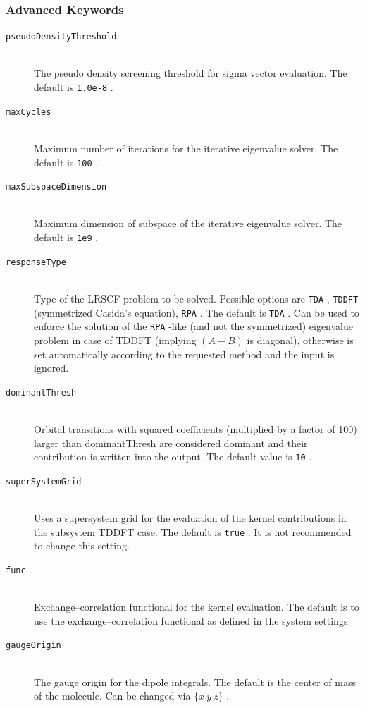 \documentclass[bibliography=totocnumbered,a4paper,10pt,oneside]{scrbook}
\newcommand{\ttt}[1]{%
  \begingroup\setlength{\fboxsep}{1pt}%
  \colorbox{serenity-green!30}{\texttt{\hspace*{2pt}\vphantom{(g}#1\hspace*{2pt}}}%
  \endgroup
}
\begin{document}
\subsubsection{Advanced Keywords}
\begin{description}
    \item [\texttt{pseudoDensityThreshold}]\hfill \\
    The pseudo density screening threshold for sigma vector evaluation. The default is \ttt{1.0e-8}.
    \item [\texttt{maxCycles}]\hfill \\
    Maximum number of iterations for the iterative eigenvalue solver. The default is \ttt{100}.
    \item [\texttt{maxSubspaceDimension}]\hfill \\
    Maximum dimension of subspace of the iterative eigenvalue solver. The default is \ttt{1e9}.
    \item [\texttt{responseType}]\hfill \\
    Type of the LRSCF problem to be solved. Possible options are \ttt{TDA}, \ttt{TDDFT} (symmetrized Casida's equation), \ttt{RPA}. The default is \ttt{TDA}. Can be used to enforce the solution of the \ttt{RPA}-like (and not the symmetrized) eigenvalue problem in case of TDDFT (implying $(A-B)$ is diagonal), otherwise is set automatically according to the requested method and the input is ignored.
    \item [\texttt{dominantThresh}]\hfill \\
    Orbital transitions with squared coefficients (multiplied by a factor of 100) larger than dominantThresh are considered dominant and their contribution is written into the output. The default value is \ttt{10}.
    \item [\texttt{superSystemGrid}]\hfill \\
    Uses a supersystem grid for the evaluation of the kernel contributions in the subsystem TDDFT case. The default is \ttt{true}. It is not recommended to change this setting.
    \item [\texttt{func}]\hfill \\
    Exchange--correlation functional for the kernel evaluation. The default is to use the exchange--correlation functional as defined in the system settings.
    \item [\texttt{gaugeOrigin}]\hfill \\
    The gauge origin for the dipole integrals. The default is the center of mass of the molecule. Can be changed via \ttt{$\{x~y~z\}$}.

\end{description}
\end{document}
